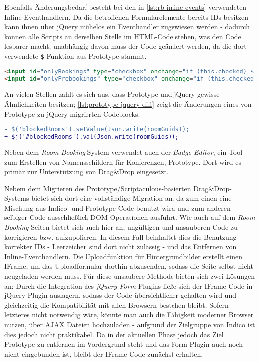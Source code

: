 Ebenfalls Änderungsbedarf besteht bei den in \autoref{lst:rb-inline-events} verwendeten
Inline-Eventhandlern. Da die betroffenen Formularelemente bereits IDs besitzen kann ihnen über
jQuery mühelos ein Eventhandler zugewiesen werden - dadurch können alle Scripts an derselben Stelle
im HTML-Code stehen, was den Code lesbarer macht; unabhängig davon muss der Code geändert werden, da
die dort verwendete \lstinline{$}-Funktion aus Prototype stammt.

\begin{lstlisting}[language=HTML,label=lst:rb-inline-events,caption=Inline-Eventhandler]
<input id="onlyBookings" type="checkbox" onchange="if (this.checked) $('onlyPrebookings').checked = false;"/>
<input id="onlyPrebookings" type="checkbox" onchange="if (this.checked) $('onlyBookings').checked = false;" />
\end{lstlisting}

An vielen Stellen zahlt es sich aus, dass Prototype und jQuery gewisse Ähnlichkeiten besitzen;
\autoref{lst:prototype-jquery-diff} zeigt die Änderungen eines von Prototype zu jQuery migrierten
Codeblocks.

\begin{lstlisting}[language=diff,label=lst:prototype-jquery-diff,caption=Ähnlichkeit zwischen jQuery und Prototype]
- $('blockedRooms').setValue(Json.write(roomGuids));
+ $j('#blockedRooms').val(Json.write(roomGuids));
\end{lstlisting}

Neben dem \emph{Room Booking}-System verwendet auch der \emph{Badge Editor}, ein Tool zum Erstellen
von Namensschildern für Konferenzen, Prototype. Dort wird es primär zur Unterstützung von Drag\&Drop
eingesetzt.


Nebem dem Migrieren des Prototype/Scriptaculous-basierten Drag\&Drop-Systems bietet sich dort eine
vollständige Migration an, da zum einen eine Mischung aus Indico- und Prototype-Code benutzt wird
und zum anderen selbiger Code ausschließlich DOM-Operationen ausführt. Wie auch auf dem \emph{Room
Booking}-Seiten bietet sich auch hier an, ungültigen und unsauberen Code zu korrigieren bzw.
aufzupolieren. In diesem Fall beinhaltet dies die Benutzung korrekter IDs - Leerzeichen sind dort
nicht zulässig - und das Entfernen von Inline-Eventhandlern. Die Uploadfunktion für
Hintergrundbilder erstellt einen IFrame, um das Uploadformular dorthin abzusenden, sodass die Seite
selbst nicht neugeladen werden muss. Für diese unsaubere Methode bieten sich zwei Lösungen an: Durch
die Integration des \emph{jQuery Form}-Plugins ließe sich der IFrame-Code in jQuery-Plugin
auslagern, sodass der Code übersichtlicher gehalten wird und gleichzeitig die Kompatibilität mit
allen Browsern bestehen bleibt. Sofern letzteres nicht notwendig wäre, könnte man auch die Fähigkeit
moderner Browser nutzen, über AJAX Dateien hochzuladen - aufgrund der Zielgruppe von Indico ist dies
jedoch nicht praktikabel. Da in der aktuellen Phase jedoch das Ziel Prototype zu entfernen im
Vordergrund steht und das Form-Plugin auch noch nicht eingebunden ist, bleibt der IFrame-Code
zunächst erhalten.

